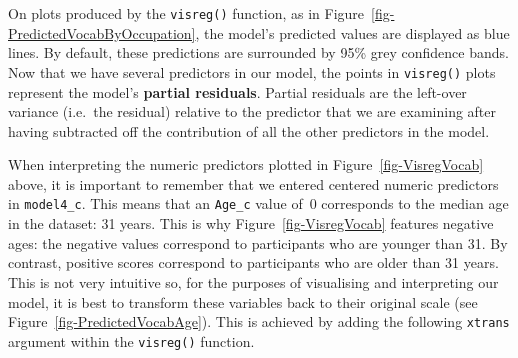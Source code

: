 \documentclass[
  letterpaper,
  DIV=11,
  numbers=noendperiod]{scrreprt}
\newenvironment{Shaded}{\begin{snugshade}}{\end{snugshade}}
\newcommand{\AttributeTok}[1]{\textcolor[rgb]{0.40,0.45,0.13}{#1}}
\newcommand{\ConstantTok}[1]{\textcolor[rgb]{0.56,0.35,0.01}{#1}}
\newcommand{\ControlFlowTok}[1]{\textcolor[rgb]{0.00,0.23,0.31}{\textbf{#1}}}
\newcommand{\FunctionTok}[1]{\textcolor[rgb]{0.28,0.35,0.67}{#1}}
\newcommand{\NormalTok}[1]{\textcolor[rgb]{0.00,0.23,0.31}{#1}}
\newcommand{\SpecialCharTok}[1]{\textcolor[rgb]{0.37,0.37,0.37}{#1}}
\newcommand{\StringTok}[1]{\textcolor[rgb]{0.13,0.47,0.30}{#1}}
\begin{document}
On plots produced by the \texttt{visreg()} function, as in
Figure~\ref{fig-PredictedVocabByOccupation}, the model's predicted
values are displayed as blue lines. By default, these predictions are
surrounded by 95\% grey confidence bands. Now that we have several
predictors in our model, the points in \texttt{visreg()} plots represent
the model's \textbf{partial residuals}. Partial residuals are the
left-over variance (i.e.~the residual) relative to the predictor that we
are examining after having subtracted off the contribution of all the
other predictors in the model.

When interpreting the numeric predictors plotted in
Figure~\ref{fig-VisregVocab} above, it is important to remember that we
entered centered numeric predictors in \texttt{model4\_c}. This means
that an \texttt{Age\_c} value of~0 corresponds to the median age in the
dataset: 31 years. This is why Figure~\ref{fig-VisregVocab} features
negative ages: the negative values correspond to participants who are
younger than 31. By contrast, positive scores correspond to participants
who are older than 31 years. This is not very intuitive so, for the
purposes of visualising and interpreting our model, it is best to
transform these variables back to their original scale (see
Figure~\ref{fig-PredictedVocabAge}). This is achieved by adding the
following \texttt{xtrans} argument within the \texttt{visreg()}
function.

\begin{Shaded}
\end{Shaded}
\end{document}
